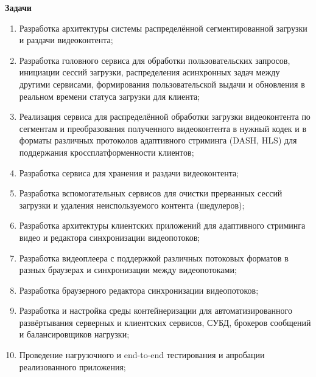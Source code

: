 	\textbf{Задачи}

	\begin{enumerate}[1.]
		\item Разработка архитектуры системы распределённой сегментированной загрузки и раздачи видеоконтента;
		\item Разработка головного сервиса для обработки пользовательских запросов, инициации сессий загрузки, распределения асинхронных задач между другими сервисами, формирования пользовательской выдачи и обновления в реальном времени статуса загрузки для клиента;
		\item Реализация сервиса для распределённой обработки загрузки видеоконтента по сегментам и преобразования полученного видеоконтента в нужный кодек и в форматы различных протоколов адаптивного стриминга (DASH, HLS) для поддержания кроссплатформенности клиентов;
		\item Разработка сервиса для хранения и раздачи видеоконтента;
		\item Разработка вспомогательных сервисов для очистки прерванных сессий загрузки и удаления неиспользуемого контента (шедулеров);
		\item Разработка архитектуры клиентских приложений для адаптивного стриминга видео и редактора синхронизации видеопотоков;
		\item Разработка видеоплеера с поддержкой различных потоковых форматов в разных браузерах и синхронизации между видеопотоками;
		\item Разработка браузерного редактора синхронизации видеопотоков;\\
		\item Разработка и настройка среды контейнеризации для автоматизированного развёртывания серверных и клиентских сервисов, СУБД, брокеров сообщений и балансировщиков нагрузки;
		\item Проведение нагрузочного и end-to-end тестирования и апробации реализованного приложения;
	\end{enumerate}
